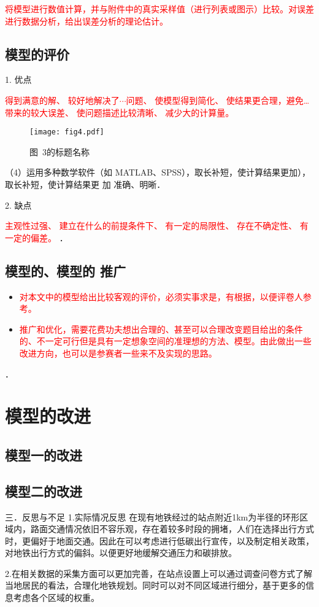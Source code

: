 \documentclass[12pt,a4paper]{mcmthesis}
\begin{document}
\textcolor{red}{将模型进行数值计算，并与附件中的真实采样值（进行列表或图示）比较。对误差进行数据分析，给出误差分析的理论估计。}

\subsection{模型的评价}


1. 优点

\textcolor{red}{得到满意的解、
较好地解决了$\cdots$问题、
使模型得到简化、
使结果更合理，避免…带来的较大误差、
使问题描述比较清晰、
减少大的计算量。}



\begin{figure}[h!t]
\centerline{\texttt{[image: fig4.pdf]}}
\caption{\song\wuhao 图~3的标题名称}
\end{figure}


（4）运用多种数学软件（如 MATLAB、SPSS），取长补短，使计算结果更加），取长补短，使计算结果更
加 准确、明晰．

2. 缺点

\textcolor{red}{主观性过强、
建立在什么的前提条件下、
有一定的局限性、
存在不确定性、
有一定的偏差。
}
．

\subsection{模型的、模型的 推广}

\begin{itemize}

\item \textcolor{red}{对本文中的模型给出比较客观的评价，必须实事求是，有根据，以便评卷人参考。}

\item \textcolor{red}{推广和优化，需要花费功夫想出合理的、甚至可以合理改变题目给出的条件的、不一定可行但是具有一定想象空间的准理想的方法、模型。由此做出一些改进方向，也可以是参赛者一些来不及实现的思路。}
\end{itemize}

．

\section{模型的改进}

\subsection{模型一的改进}


\subsection{模型二的改进}
三．反思与不足
1.实际情况反思
在现有地铁经过的站点附近1km为半径的环形区域内，路面交通情况依旧不容乐观，存在着较多时段的拥堵，人们在选择出行方式时，更偏好于地面交通。因此在可以考虑进行低碳出行宣传，以及制定相关政策，对地铁出行方式的偏斜。以便更好地缓解交通压力和碳排放。

2.在相关数据的采集方面可以更加完善，在站点设置上可以通过调查问卷方式了解当地居民的看法，合理化地铁规划。同时可以对不同区域进行细分，基于更多的信息考虑各个区域的权重。
\end{document}
